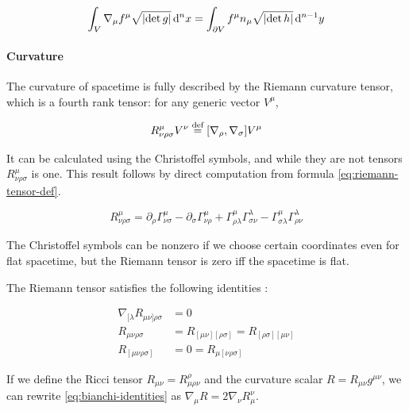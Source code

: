 \documentclass[main.tex]{subfiles}
\begin{document}
\begin{equation} \label{eq:stokes-theorem}
    \int _{V} \nabla_\mu f^\mu \sqrt{\abs{\det g}}  \dd[n]{x}  = \int _{\partial V} f^\mu  n_\mu \sqrt{\abs{\det h}} \dd[n-1]{y}
\end{equation}

\paragraph{Curvature}

The curvature of spacetime is fully described by the Riemann curvature tensor, which is a fourth rank tensor: for any generic vector \(V^\mu\),

\begin{equation} \label{eq:riemann-tensor-def}
    R ^{\mu} _{\nu \rho \sigma} V^\nu \stackrel{\text{def}}{=} [\nabla_\rho, \nabla_\sigma]   V^\mu
\end{equation}

It can be calculated using the Christoffel symbols, and while they are not tensors \(R ^{\mu} _{\nu \rho \sigma}\) is one. This result follows by direct computation from formula \eqref{eq:riemann-tensor-def}.

\begin{equation}
    R ^{\mu} _{\nu \rho \sigma} =
     \partial_\rho \Gamma^\mu_{\nu \sigma}
    -\partial_\sigma \Gamma^\mu_{\nu \rho}
    +\Gamma^\mu_{\rho \lambda} \Gamma ^{\lambda} _{\sigma \nu}
    -\Gamma^\mu_{\sigma \lambda} \Gamma ^{\lambda} _{\rho \nu}
\end{equation}

The Christoffel symbols can be nonzero if we choose certain coordinates even for flat spacetime, but the Riemann tensor is zero iff the spacetime is flat.

The Riemann tensor satisfies the following identities \cite[eqs. 8.45 and 8.76]{MisnerThorneWheeler:1973}:

\begin{subequations}
\begin{align}
  \nabla _{[\lambda} R_{\mu\nu]\rho \sigma} &= 0 \label{eq:bianchi-identities}  \\
  R_{\mu\nu\rho\sigma} &= R_{[\mu\nu][\rho\sigma]} = R_{[\rho\sigma][\mu\nu]}  \\
  R_{[\mu\nu\rho\sigma]} &= 0 = R_{\mu[\nu\rho\sigma]}
\end{align}
\end{subequations}

If we define the Ricci tensor \(R_{\mu\nu} = R^\rho_{\mu \rho \nu}\) and the curvature scalar \(R = R_{\mu\nu}g^{\mu\nu}\), we can rewrite \eqref{eq:bianchi-identities}  as \(\nabla_\mu R = 2 \nabla_\nu R^{\nu}_{\mu}\).
\end{document}
